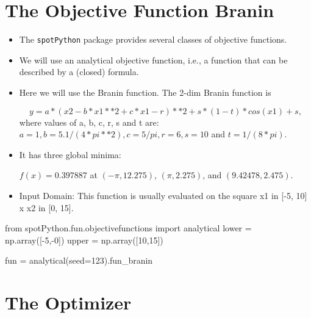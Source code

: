 \documentclass[
  letterpaper,
  DIV=11,
  numbers=noendperiod]{scrreprt}
\newenvironment{Shaded}{\begin{snugshade}}{\end{snugshade}}
\newcommand{\DecValTok}[1]{\textcolor[rgb]{0.68,0.00,0.00}{#1}}
\newcommand{\ImportTok}[1]{\textcolor[rgb]{0.00,0.46,0.62}{#1}}
\newcommand{\NormalTok}[1]{\textcolor[rgb]{0.00,0.23,0.31}{#1}}
\newcommand{\OperatorTok}[1]{\textcolor[rgb]{0.37,0.37,0.37}{#1}}
\begin{document}
\hypertarget{the-objective-function-branin-1}{%
\section{The Objective Function
Branin}\label{the-objective-function-branin-1}}

\begin{itemize}
\item
  The \texttt{spotPython} package provides several classes of objective
  functions.
\item
  We will use an analytical objective function, i.e., a function that
  can be described by a (closed) formula.
\item
  Here we will use the Branin function. The 2-dim Branin function is

  \[y = a * (x2 - b * x1**2 + c * x1 - r) ** 2 + s * (1 - t) * cos(x1) + s,\]
  where values of a, b, c, r, s and t are:
  \(a = 1, b = 5.1 / (4*pi**2), c = 5 / pi, r = 6, s = 10\) and
  \(t = 1 / (8*pi)\).
\item
  It has three global minima:

  \(f(x) = 0.397887\) at \((-\pi, 12.275)\), \((\pi, 2.275)\), and
  \((9.42478, 2.475)\).
\item
  Input Domain: This function is usually evaluated on the square x1 in
  {[}-5, 10{]} x x2 in {[}0, 15{]}.
\end{itemize}

\begin{Shaded}
\begin{Highlighting}[]
\ImportTok{from}\NormalTok{ spotPython.fun.objectivefunctions }\ImportTok{import}\NormalTok{ analytical}
\NormalTok{lower }\OperatorTok{=}\NormalTok{ np.array([}\OperatorTok{{-}}\DecValTok{5}\NormalTok{,}\OperatorTok{{-}}\DecValTok{0}\NormalTok{])}
\NormalTok{upper }\OperatorTok{=}\NormalTok{ np.array([}\DecValTok{10}\NormalTok{,}\DecValTok{15}\NormalTok{])}
\end{Highlighting}
\end{Shaded}

\begin{Shaded}
\begin{Highlighting}[]
\NormalTok{fun }\OperatorTok{=}\NormalTok{ analytical(seed}\OperatorTok{=}\DecValTok{123}\NormalTok{).fun\_branin}
\end{Highlighting}
\end{Shaded}

\hypertarget{the-optimizer}{%
\section{The Optimizer}\label{the-optimizer}}
\end{document}
